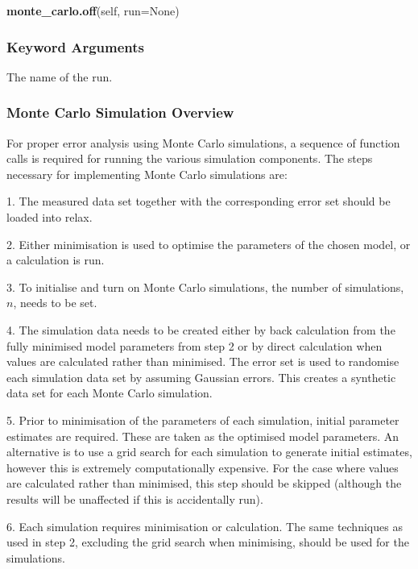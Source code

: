  \textsf{\textbf{monte\_carlo.off}(self, run=None)} 

  
 \subsubsection{Keyword Arguments} 

   The name of the run.  

  

  
 \subsubsection{Monte Carlo Simulation Overview} 

 For proper error analysis using Monte Carlo simulations, a sequence of function calls is required for running the various simulation components.  The steps necessary for implementing Monte Carlo simulations are: 
  

 1.  The measured data set together with the corresponding error set should be loaded into relax. 
  

 2.  Either minimisation is used to optimise the parameters of the chosen model, or a calculation is run. 
  

 3.  To initialise and turn on Monte Carlo simulations, the number of simulations, $n$, needs to be set. 
  

 4.  The simulation data needs to be created either by back calculation from the fully minimised model parameters from step 2 or by direct calculation when values are calculated rather than minimised.  The error set is used to randomise each simulation data set by assuming Gaussian errors.  This creates a synthetic data set for each Monte Carlo simulation. 
  

 5.  Prior to minimisation of the parameters of each simulation, initial parameter estimates are required.  These are taken as the optimised model parameters.  An alternative is to use a grid search for each simulation to generate initial estimates, however this is extremely computationally expensive.  For the case where values are calculated rather than minimised, this step should be skipped (although the results will be unaffected if this is accidentally run). 
  

 6.  Each simulation requires minimisation or calculation.  The same techniques as used in step 2, excluding the grid search when minimising, should be used for the simulations. 
  

